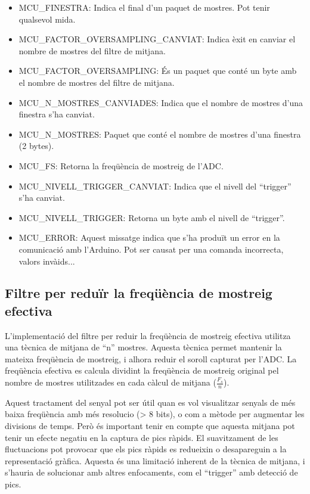 \documentclass{tfgitic}[2023/06/30]
\begin{document}
\begin{itemize}
\item MCU\_FINESTRA: Indica el final d'un paquet de mostres. Pot tenir
  qualsevol mida.
\item MCU\_FACTOR\_OVERSAMPLING\_CANVIAT: Indica èxit en canviar el
  nombre de mostres del filtre de mitjana.
\item MCU\_FACTOR\_OVERSAMPLING: És un paquet que conté un byte amb el
  nombre de mostres del filtre de mitjana.
\item MCU\_N\_MOSTRES\_CANVIADES: Indica que el nombre de mostres
  d'una finestra s'ha canviat.
\item MCU\_N\_MOSTRES: Paquet que conté el nombre de mostres d'una
  finestra (2 bytes).
\item MCU\_FS: Retorna la freqüència de mostreig de l'ADC.
\item MCU\_NIVELL\_TRIGGER\_CANVIAT: Indica que el nivell del
  ``trigger'' s'ha canviat.
\item MCU\_NIVELL\_TRIGGER: Retorna un byte amb el nivell de
  ``trigger''.
\item MCU\_ERROR: Aquest missatge indica que s'ha produït un error en
  la comunicació amb l'Arduino. Pot ser causat per una comanda
  incorrecta, valors invà\lgem ids...
\end{itemize}

\subsection{Filtre per reduïr la freqüència de mostreig efectiva}

L'implementació del filtre per reduir la freqüència de mostreig
efectiva utilitza una tècnica de mitjana de ``n'' mostres. Aquesta
tècnica permet mantenir la mateixa freqüència de mostreig, i alhora
reduir el soroll capturat per l'ADC. La freqüència efectiva es calcula
dividint la freqüència de mostreig original pel nombre de mostres
utilitzades en cada càlcul de mitjana ($\frac{F_{s}}{n}$).

Aquest tractament del senyal pot ser útil quan es vol visualitzar
senyals de més baixa freqüència amb més resolucio (> 8 bits), o com a
mètode per augmentar les divisions de temps. Però és important tenir
en compte que aquesta mitjana pot tenir un efecte negatiu en la
captura de pics ràpids. El suavitzament de les fluctuacions pot
provocar que els pics ràpids es redueixin o desapareguin a la
representació gràfica. Aquesta és una limitació inherent de la tècnica
de mitjana, i s'hauria de solucionar amb altres enfocaments, com el
``trigger'' amb detecció de pics.
\end{document}
